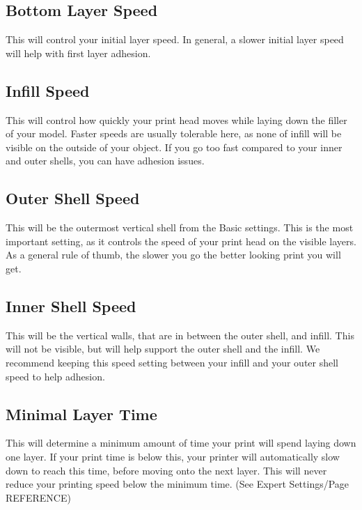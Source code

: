 \subsection{Bottom Layer Speed}

This will control your initial layer speed. In general, a slower initial layer speed will help with first layer adhesion. 

\subsection{Infill Speed}

This will control how quickly your print head moves while laying down the filler of your model. Faster speeds are usually tolerable here, as none of infill will be visible on the outside of your object. If you go too fast compared to your inner and outer shells, you can have adhesion issues.

\subsection{Outer Shell Speed}

This will be the outermost vertical shell from the Basic settings. This is the most important setting, as it controls the speed of your print head on the visible layers. As a general rule of thumb, the slower you go the better looking print you will get. 

\subsection{Inner Shell Speed}

This will be the vertical walls, that are in between the outer shell,         and infill. This will not be visible, but will help support the outer shell and the infill. We recommend keeping this speed setting between your infill and your outer shell speed to help adhesion.

\subsection{Minimal Layer Time}

This will determine a minimum amount of time your print will spend laying down one layer. If your print time is below this, your printer will automatically slow down to reach this time, before moving onto the next layer. This will never reduce your printing speed below the minimum time. (See Expert Settings/Page REFERENCE)

